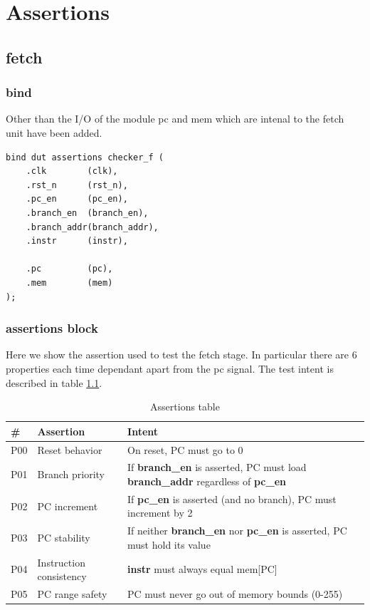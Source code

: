 \chapter{Assertions} 
\label{cha:assertions}

\section{fetch}

\subsection*{bind}

Other than the I/O of the module pc and mem which are intenal to the fetch unit have been added.

\begin{verbatim}
bind dut assertions checker_f (
    .clk        (clk),
    .rst_n      (rst_n),
    .pc_en      (pc_en),
    .branch_en  (branch_en),
    .branch_addr(branch_addr),
    .instr      (instr),

    .pc         (pc),
    .mem        (mem)
);
\end{verbatim}

\subsection*{assertions block}

Here we show the assertion used to test the fetch stage. 
In particular there are 6 properties each time dependant apart from the pc signal. 
The test intent is described in table \ref{tbl:assertions}.

\begin{table}[h]
	\centering
	\begin{tabular}{|l|l|l|}
		\hline
		\textbf{\#} & \textbf{Assertion} 		& \textbf{Intent} \\ \hline
		P00 		& Reset behavior 	 		& On reset, PC must go to 0 \\ \hline
		P01 		& Branch priority	 		& If \textbf{branch\_en} is asserted, PC must load \textbf{branch\_addr} regardless of \textbf{pc\_en} \\ \hline
		P02 		& PC increment   	 		& If \textbf{pc\_en} is asserted (and no branch), PC must increment by 2 \\ \hline
		P03 		& PC stability   	 		& If neither \textbf{branch\_en} nor \textbf{pc\_en} is asserted, PC must hold its value \\ \hline
		P04 		& Instruction consistency 	& \textbf{instr} must always equal mem[PC] \\ \hline
		P05 		& PC range safety 			& PC must never go out of memory bounds (0-255) \\ \hline
	\end{tabular}
	\caption{Assertions table}
	\label{tbl:assertions}
\end{table}



